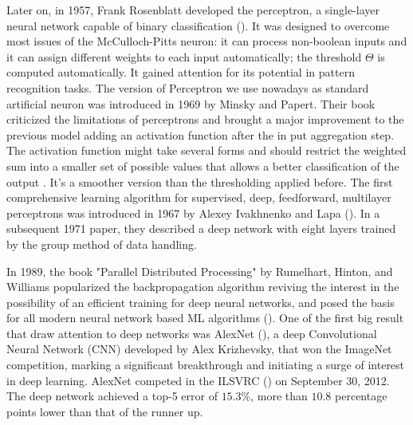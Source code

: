 \documentclass[binding=0.6cm]{sapthesis}
\newcommand{\mycite}[1]{(\cite{#1})}
\begin{document}
Later on, in 1957, Frank Rosenblatt developed the perceptron, a single-layer neural network capable of binary classification \mycite{rosenblatt-1958-perceptron}.  It was designed to overcome most issues of the McCulloch-Pitts neuron: it can process non-boolean inputs and it can assign different weights to each input automatically; the threshold $\Theta$ is computed automatically. It gained attention for its potential in pattern recognition tasks. The version of Perceptron we use nowadays as standard artificial neuron was introduced in 1969 by Minsky and Papert. Their book criticized the limitations of perceptrons and brought a major improvement to the previous model adding an activation function after the in put aggregation step. The activation function might take several forms and should restrict the weighted sum into a smaller set of possible values that allows a better classification of the output \cite{minsky-papert-1969-perceptrons}. It’s a smoother version than the thresholding applied before. The first comprehensive learning algorithm for supervised, deep, feedforward, multilayer perceptrons was introduced in 1967 by Alexey Ivakhnenko and Lapa \mycite{Ivakhnenko1967CyberneticsAF}.  In a subsequent 1971 paper, they described a deep network with eight layers trained by the group method of data handling. 

In 1989, the book "Parallel Distributed Processing" by Rumelhart, Hinton, and Williams popularized the backpropagation algorithm reviving the interest in the possibility of an efficient training for deep neural networks, and posed the basis for all modern neural network based ML algorithms \mycite{rumelhart-hinton-1989}. One of the first big result that draw attention to deep networks was AlexNet \mycite{krizhevsky2012-nips}, a deep Convolutional Neural Network (CNN) developed by Alex Krizhevsky, that won the ImageNet competition, marking a significant breakthrough and initiating a surge of interest in deep learning. AlexNet competed in the ILSVRC \mycite{ILSVRC15} on September 30, 2012. The deep network achieved a top-5 error of $15.3\%$, more than $10.8$ percentage points lower than that of the runner up. 
\end{document}
